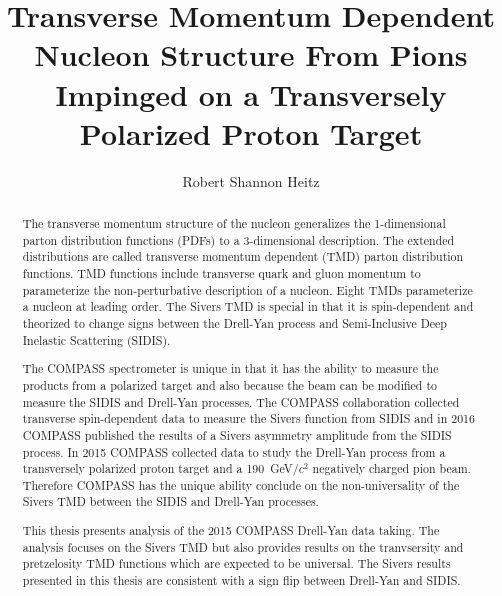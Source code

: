 \documentclass[edeposit,fullpage]{Classes/uiucthesis2009}
\newcommand{\gvcw}{GeV/$c^2$} \newcommand{\mvcw}{MeV/$c^2$}
\begin{document}
\title{Transverse Momentum Dependent Nucleon Structure From Pions Impinged
  on a Transversely Polarized Proton Target}

\author{Robert Shannon Heitz}
\phdthesis
{}
  
\maketitle

\frontmatter

\begin{abstract}
The transverse momentum structure of the nucleon generalizes the 1-dimensional
parton distribution functions (PDFs) to a 3-dimensional description.  The
extended distributions are called transverse momentum dependent (TMD) parton
distribution functions.  TMD functions include transverse quark and gluon
momentum to parameterize the non-perturbative description of a nucleon.  Eight
TMDs parameterize a nucleon at leading order.  The Sivers TMD is special in
that it is spin-dependent and theorized to change signs between the Drell-Yan
process and Semi-Inclusive Deep Inelastic Scattering (SIDIS).

The COMPASS spectrometer is unique in that it has the ability to measure the
products from a polarized target and also because the beam can be modified to
measure the SIDIS and Drell-Yan processes.  The COMPASS collaboration collected
transverse spin-dependent data to measure the Sivers function from SIDIS and in
2016 COMPASS published the results of a Sivers asymmetry amplitude from the
SIDIS process.  In 2015 COMPASS collected data to study the Drell-Yan process
from a transversely polarized proton target and a 190~{\gvcw} negatively charged
pion beam.  Therefore COMPASS has the unique ability conclude on the
non-universality of the Sivers TMD between the SIDIS and Drell-Yan processes.

This thesis presents analysis of the 2015 COMPASS Drell-Yan data taking.  The
analysis focuses on the Sivers TMD but also provides results on the tranvsersity
and pretzelosity TMD functions which are expected to be universal.  The Sivers
results presented in this thesis are consistent with a sign flip between
Drell-Yan and SIDIS.
\end{abstract}
\end{document}
